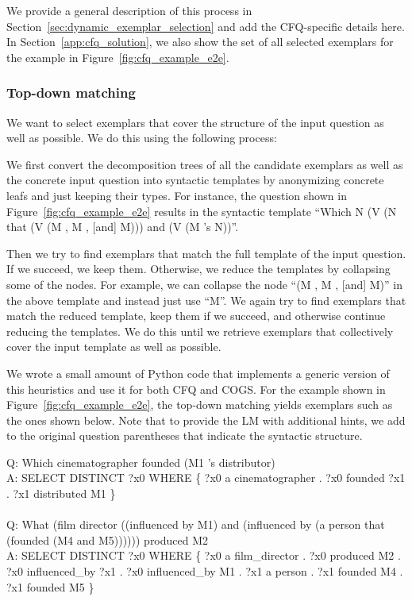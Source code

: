 \documentclass{article} \usepackage{iclr2022_conference,times}
\newcommand{\prompt}[1]{{\footnotesize \textsf{#1}}}
\begin{document}
We provide a general description of this process in Section~\ref{sec:dynamic_exemplar_selection} and add the CFQ-specific details here. In Section~\ref{app:cfq_solution}, we also show the set of all selected exemplars for the example in Figure~\ref{fig:cfq_example_e2e}.

\subsubsection{Top-down matching}
We want to select exemplars that cover the structure of the input question as well as possible. We do this using the following process:

We first convert the decomposition trees of all the candidate exemplars as well as the concrete input question into syntactic templates by anonymizing concrete leafs and just keeping their types. For instance, the question shown in Figure~\ref{fig:cfq_example_e2e} results in the syntactic template ``Which N (V (N that (V (M , M , [and] M))) and (V (M 's N))''.

Then we try to find exemplars that match the full template of the input question. If we succeed, we keep them. Otherwise, we reduce the templates by collapsing some of the nodes. For example, we can collapse the node ``(M , M , [and] M)'' in the above template and instead just use ``M''. We again try to find exemplars that match the reduced template, keep them if we succeed, and otherwise continue reducing the templates. We do this until we retrieve exemplars that collectively cover the input template as well as possible.

We wrote a small amount of Python code that implements a generic version of this heuristics and use it for both CFQ and COGS. For the example shown in Figure~\ref{fig:cfq_example_e2e}, the top-down matching yields exemplars such as the ones shown below. Note that to provide the LM with additional hints, we add to the original question parentheses that indicate the syntactic structure.

\prompt{Q: Which cinematographer founded (M1 's distributor)\\
A: SELECT DISTINCT ?x0 WHERE \{ ?x0 a cinematographer . ?x0 founded ?x1 . ?x1 distributed M1 \}\\
\\
Q: What (film director ((influenced by M1) and (influenced by (a person that (founded (M4 and M5)))))) produced M2\\
A: SELECT DISTINCT ?x0 WHERE \{ ?x0 a film\_director . ?x0 produced M2 . ?x0 influenced\_by ?x1 . ?x0 influenced\_by M1 . ?x1 a person . ?x1 founded M4 . ?x1 founded M5 \}
}
\end{document}
